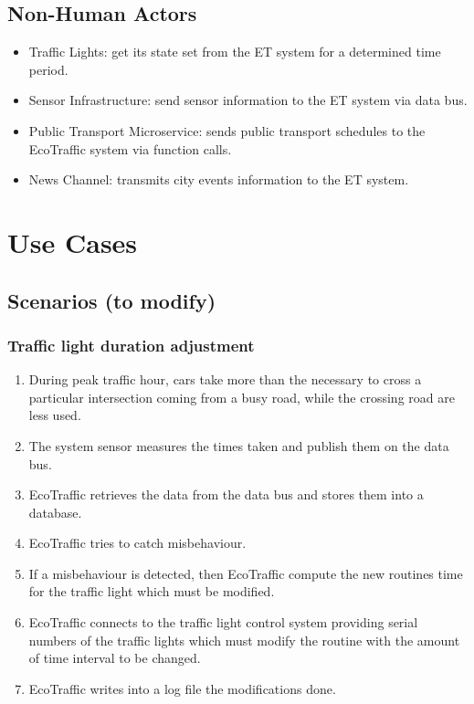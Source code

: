 \documentclass[12pt, a4paper, twoside, openright]{report}
\begin{document}
\subsection{Non-Human Actors}
\begin{itemize}
  \item Traffic Lights: get its state set from the ET system for a determined time period.
  \item Sensor Infrastructure: send sensor information to the ET system via data bus.
  \item Public Transport Microservice: sends public transport schedules to the EcoTraffic system via function calls.
  \item News Channel: transmits city events information to the ET system.
\end{itemize}

\section{Use Cases}\label{sec:use-cases}
\subsection{Scenarios (to modify)}\label{subsec:scenarios}

\subsubsection{Traffic light duration adjustment}\label{subsubsec:traffic-light-duration}

\begin{enumerate}
\item
  During peak traffic hour, cars take more than the necessary to cross a
  particular intersection coming from a busy road, while the crossing
  road are less used.
\item
  The system sensor measures the times taken and publish them on the
  data bus.
\item
  EcoTraffic retrieves the data from the data bus and stores them into a
  database.
\item
  EcoTraffic tries to catch misbehaviour.
\item
  If a misbehaviour is detected, then EcoTraffic compute the new
  routines time for the traffic light which must be modified.
\item
  EcoTraffic connects to the traffic light control system providing
  serial numbers of the traffic lights which must modify the routine
  with the amount of time interval to be changed.
\item
  EcoTraffic writes into a log file the modifications done.
\end{enumerate}
\end{document}
